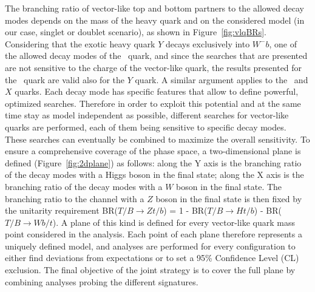 
The branching ratio of vector-like top and bottom partners 
to the allowed decay modes depends
on the mass of the heavy quark and on the considered model (in our case, singlet or doublet
scenario), as shown in Figure~\ref{fig:vlqBRs}.
Considering that the exotic heavy quark $Y$ decays
exclusively into $W^{-}b$, one of the allowed
decay modes of the \T\ quark, and since
the searches that are presented are not
sensitive to the charge of the vector-like quark,
the results presented for the  \T\ quark are
valid also for the $Y$ quark. A similar
argument applies to the \B\ and $X$ quarks. 
Each decay mode has specific features that allow to define powerful, optimized searches.
Therefore in order to exploit this potential and at the same time stay as model independent
as possible, different searches for vector-like quarks 
are performed, each of them being sensitive to specific decay modes.
These searches can eventually be combined to maximize 
the overall sensitivity.
To ensure a comprehensive coverage of the phase space, a two-dimensional plane is defined 
(Figure~\ref{fig:2dplane}) as follows:
along the Y axis is the branching ratio of the decay 
modes with a Higgs boson in the final state; along the X axis is the branching ratio 
of the decay modes with a $W$ boson in the final state.
The branching ratio to the channel with a $Z$ boson in the final state is then fixed by the 
unitarity requirement BR($T/B\to  Zt/b$) = 1 - BR($T/B\to Ht/b$) - BR($T/B\to Wb/t$).
A plane of this kind is defined for every vector-like quark mass point considered 
in the analysis. Each point of each plane therefore represents a 
uniquely defined model, and analyses are performed for every configuration
to either find deviations from expectations or to set a 95\% Confidence Level (CL) exclusion.
The final objective of the joint strategy is to cover the full plane by combining
analyses probing the different signatures.

